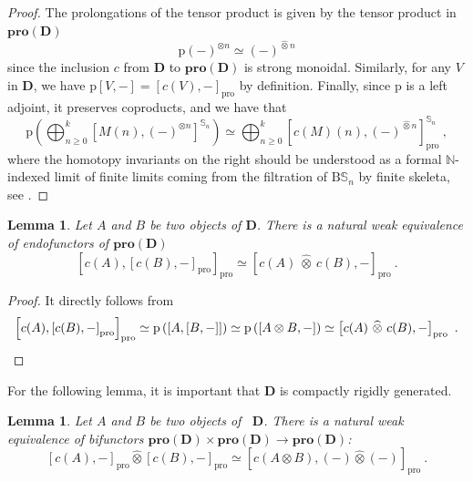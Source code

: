 \documentclass{proc-l}
\theoremstyle{plain}
\newtheorem{lemma}[{theorem}]{Lemma}
\theoremstyle{definition}
\theoremstyle{remark}
\begin{document}
\begin{proof}
The prolongations of the tensor product is given by the tensor product in $\mathbf{pro}(\mathbf{D})$
\[
\mathrm{p}(-)^{\otimes n} \simeq (-)^{\widehat{\otimes} n}
\]
since the inclusion $c$ from $\mathbf{D}$ to $\mathbf{pro}(\mathbf{D})$ is strong monoidal. Similarly, for any $V$ in $\mathbf{D}$, we have $ \mathrm{p}[V,-] = \left[c(V),-\right]_{\mathrm{pro}}$  by definition.
Finally, since $\mathrm{p}$ is a left adjoint, it preserves coproducts, and we have that
\[
\mathrm{p}\left(\bigoplus_{n \geq 0}^{k} \left[M(n),(-)^{\otimes n} \right]^{\mathbb{S}_n}\right) \simeq \bigoplus_{n \geq 0}^{k} \left[c(M)(n),(-)^{\widehat{\otimes} n} \right]^{\mathbb{S}_n}_{\mathrm{pro}}~,
\]
where the homotopy invariants on the right should be understood as a formal $\mathbb{N}$-indexed limit of finite limits coming from the filtration of $\mathrm{B}\mathbb{S}_n$ by finite skeleta, see \cite[Remark 5.2]{bachmann2024}.
\end{proof}

\begin{lemma}%
\label{Lemma:3.8}\label{lemma: enriched pro-adjunction}
Let $A$ and $B$ be two objects of $\mathbf{D}$. There is a natural weak equivalence of endofunctors of $\mathbf{pro}(\mathbf{D})$
\[
\left[c(A),\left[c(B),-\right]_{\mathrm{pro}}\right]_{\mathrm{pro}} \simeq \left[c(A)~  \widehat{\otimes} ~ c(B),-\right]_{\mathrm{pro}}~.
\]
\end{lemma}

\begin{proof}
It directly follows from
\[
\left[c(A),\left[c(B),-\right]_{\mathrm{pro}}\right]_{\mathrm{pro}} \simeq \mathrm{p} \left( \left[A,\left[B,-\right]\right]\right) \simeq \mathrm{p} \left(\left[A \otimes B,-\right]\right) \simeq \left[c(A)~  \widehat{\otimes} ~ c(B),-\right]_{\mathrm{pro}}~.  \qedhere
\]
\end{proof}
For the following lemma, it is important that $\mathbf{D}$ is compactly rigidly generated.
\begin{lemma}%
\label{Lemma:3.9}\label{lemma: pro-tensor and pro-enrichment}
Let $A$ and $B$ be two objects of \, $\mathbf{D}$. There is a natural weak equivalence of bifunctors $\mathbf{pro}(\mathbf{D}) \times \mathbf{pro}(\mathbf{D}) \longrightarrow \mathbf{pro}(\mathbf{D})$:
\[
\left[c(A),-\right]_{\mathrm{pro}} \widehat{\otimes} \left[c(B),-\right]_{\mathrm{pro}} \simeq \left[c(A \otimes B),(-) {\widehat{\otimes}} (-)\right]_{\mathrm{pro}}~.
\]
\end{lemma}
\end{document}
